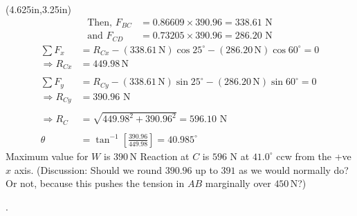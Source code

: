 \documentclass[10pt,oneside]{article}
\begin{document}
\begin{textblock*}{3.75in}(4.625in,3.25in)
	\begin{align*}
		\text{Then, } F_{BC} & = 0.86609\times 390.96 = 338.61\text{ N} \\
		\text{and } F_{CD}   & = 0.73205\times 390.96 = 286.20\text{ N}
	\end{align*}
	\centering
	\parb
	\begin{align*}
		\sum F_x      & = R_{Cx}-(338.61\,\text{N})\cos 25^\circ-(286.20\,\text{N})\cos 60^\circ =0           \\
		\Rightarrow R_{Cx} & = 449.98\,\text{N}                                          \\\\
		\sum F_y      & = R_{Cy} -(338.61\,\text{N})\sin 25^\circ-(286.20\,\text{N})\sin 60^\circ =0           \\
		\Rightarrow R_{Cy} & = 390.96\text{ N}                                          \\\\
		\Rightarrow R_C & = \sqrt{449.98^2+390.96^2}=596.10 \text{ N}                \\\\
		\theta          & = \tan^{-1}\left[\frac{390.96}{449.98}\right]=40.985^\circ
	\end{align*}
	\parb\large
	Maximum value for $W$ is $390\,\text{N}$ \parb
	Reaction at $C$ is $596$ N at $41.0^\circ$ ccw from the +ve $x$ axis.
	\parb
	\normalsize
	(Discussion: Should we round $390.96$ up to $391$ as we would normally do? Or not, because this pushes the tension in $AB$ marginally over $450\,\text{N}$?)
\end{textblock*}





.\newpage
\end{document}
